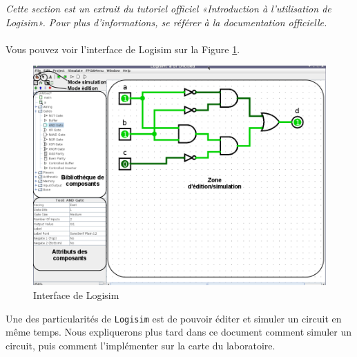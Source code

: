 \textit{Cette section est un extrait du tutoriel officiel «Introduction à l’utilisation de Logisim». Pour plus d'informations, se référer à la documentation officielle.}
\paragraph{}

Vous pouvez voir l'interface de Logisim sur la Figure  \ref{fig_logisim_description}.

\begin{figure}[t]
\begin{center}
\includegraphics[width=500pt]{pictures/Logisim_description.png}
\caption{\label{fig_logisim_description}Interface de Logisim}
\end{center}
\end{figure}

Une des particularités de \texttt{Logisim} est de pouvoir éditer et simuler un circuit en même temps.
Nous expliquerons plus tard dans ce document comment simuler un circuit, puis comment l'implémenter sur la carte du
laboratoire.


